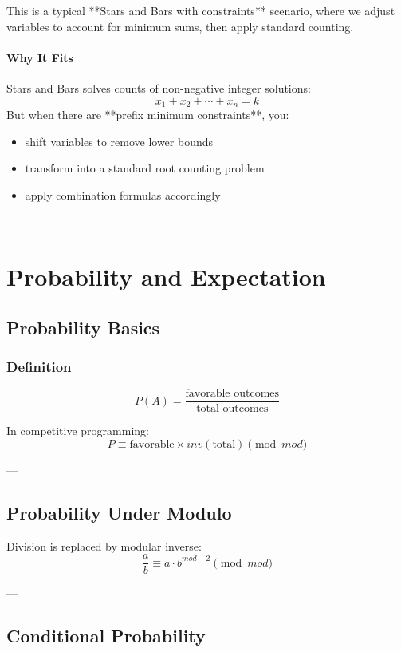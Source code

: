 \documentclass[11pt]{article}
\begin{document}
This is a typical **Stars and Bars with constraints** scenario, where
we adjust variables to account for minimum sums, then apply standard counting.

\paragraph{Why It Fits}

Stars and Bars solves counts of non-negative integer solutions:
\[
x_1 + x_2 + \cdots + x_n = k
\]
But when there are **prefix minimum constraints**, you:
\begin{itemize}
    \item shift variables to remove lower bounds
    \item transform into a standard root counting problem
    \item apply combination formulas accordingly
\end{itemize}

---

\section{Probability and Expectation}

\subsection{Probability Basics}

\subsubsection{Definition}
\[
P(A) = \frac{\text{favorable outcomes}}
             {\text{total outcomes}}
\]

In competitive programming:
\[
P \equiv \text{favorable} \times inv(\text{total}) \pmod{mod}
\]

---

\subsection{Probability Under Modulo}

Division is replaced by modular inverse:
\[
\frac{a}{b} \equiv a \cdot b^{mod-2} \pmod{mod}
\]

---

\subsection{Conditional Probability}
\end{document}
